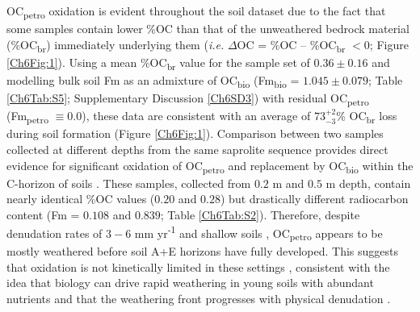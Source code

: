 OC\textsubscript{petro} oxidation is evident throughout the soil dataset due to the fact that some samples contain lower \%OC than that of the unweathered bedrock material (\%OC\textsubscript{br}) immediately underlying them (\textit{i.e.} $\Delta$OC = \%OC -- \%OC\textsubscript{br} $< 0$; Figure \ref{Ch6Fig:1}). Using a mean \%OC\textsubscript{br} value for the sample set of $0.36 \pm 0.16$ and modelling bulk soil Fm as an admixture of OC\textsubscript{bio} (Fm\textsubscript{bio} = $1.045 \pm 0.079$; Table \ref{Ch6Tab:S5}; Supplementary Discussion \ref{Ch6SD3}) with residual OC\textsubscript{petro} (Fm\textsubscript{petro} $\equiv 0.0$), these data are consistent with an average of $73^{+2}_{-3}$\% OC\textsubscript{br} loss during soil formation (Figure \ref{Ch6Fig:1}). Comparison between two samples collected at different depths from the same saprolite sequence provides direct evidence for significant oxidation of OC\textsubscript{petro} and replacement by OC\textsubscript{bio} within the C-horizon of soils \citep{Hilton:2013kq}. These samples, collected from $0.2$ m and $0.5$ m depth, contain nearly identical \%OC values ($0.20$ and $0.28$) but drastically different radiocarbon content (Fm = $0.108$ and $0.839$; Table \ref{Ch6Tab:S2}). Therefore, despite denudation rates of $3 - 6$ mm yr\textsuperscript{-1} \citep{Dadson:2003kl} and shallow soils \citep[$\leq 0.8$ m;][]{Tsai:2001vp}, OC\textsubscript{petro} appears to be mostly weathered before soil A+E horizons have fully developed. This suggests that oxidation is not kinetically limited in these settings \citep[\textit{c.f.}][]{Chang:1999vo,Petsch:2001eq}, consistent with the idea that biology can drive rapid weathering in young soils with abundant nutrients and that the weathering front progresses with physical denudation \citep{Brantley:2011ku}.

